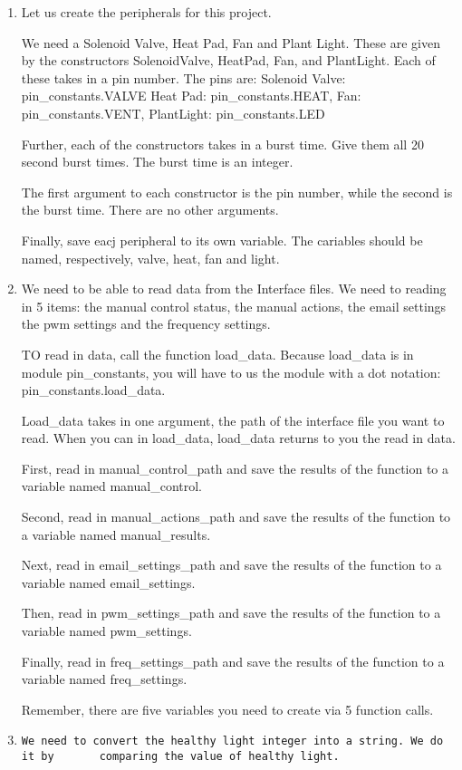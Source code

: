 \documentclass[
]{article}
\begin{document}
\begin{enumerate}
\def\labelenumi{\arabic{enumi}.}
\setcounter{enumi}{2}
\item
  Let us create the peripherals for this project.

  We need a Solenoid Valve, Heat Pad, Fan and Plant Light. These are
  given by the constructors SolenoidValve, HeatPad, Fan, and PlantLight.
  Each of these takes in a pin number. The pins are: Solenoid Valve:
  pin\_constants.VALVE Heat Pad: pin\_constants.HEAT, Fan:
  pin\_constants.VENT, PlantLight: pin\_constants.LED

  Further, each of the constructors takes in a burst time. Give them all
  20 second burst times. The burst time is an integer.

  The first argument to each constructor is the pin number, while the
  second is the burst time. There are no other arguments.

  Finally, save eacj peripheral to its own variable. The cariables
  should be named, respectively, valve, heat, fan and light.
\item
  We need to be able to read data from the Interface files. We need to
  reading in 5 items: the manual control status, the manual actions, the
  email settings the pwm settings and the frequency settings.

  TO read in data, call the function load\_data. Because load\_data is
  in module pin\_constants, you will have to us the module with a dot
  notation: pin\_constants.load\_data.

  Load\_data takes in one argument, the path of the interface file you
  want to read. When you can in load\_data, load\_data returns to you
  the read in data.

  First, read in manual\_control\_path and save the results of the
  function to a variable named manual\_control.

  Second, read in manual\_actions\_path and save the results of the
  function to a variable named manual\_results.

  Next, read in email\_settings\_path and save the results of the
  function to a variable named email\_settings.

  Then, read in pwm\_settings\_path and save the results of the function
  to a variable named pwm\_settings.

  Finally, read in freq\_settings\_path and save the results of the
  function to a variable named freq\_settings.

  Remember, there are five variables you need to create via 5 function
  calls.
\item
\begin{verbatim}
We need to convert the healthy light integer into a string. We do it by       comparing the value of healthy light. 
\end{verbatim}


\end{enumerate}
\end{document}
